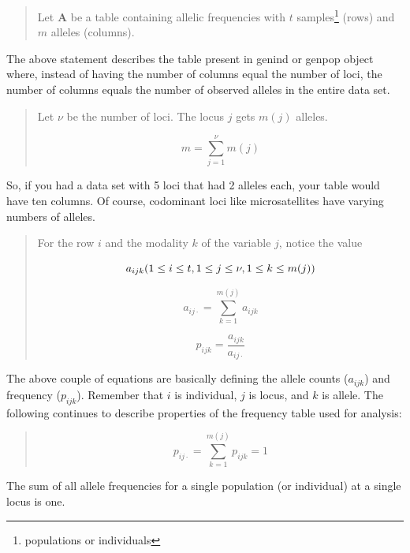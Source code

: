 \documentclass[letterpaper]{article}\usepackage[]{graphicx}\usepackage[]{color}
\begin{document}
\begin{quote}
Let \textbf{A} be a table containing allelic frequencies with $t$
samples\footnote{populations or individuals} (rows) and $m$ alleles (columns).\\
\end{quote}
The above statement describes the table present in genind or genpop object
where, instead of having the number of columns equal the number of loci, the
number of columns equals the number of observed alleles in the entire data set.

\begin{quote}
Let $\nu$ be the number of loci. The locus $j$ gets $m(j)$ alleles. 

\begin{equation}
  m=\sum_{j=1}^{\nu} m(j)
\end{equation}
\end{quote}

So, if you had a data set with 5 loci that had 2 alleles each, your table
would have ten columns. Of course, codominant loci like microsatellites have
varying numbers of alleles.


\begin{quote}
For the row $i$ and the modality $k$ of the variable $j$, notice the value

\begin{equation}
  a_{ijk}\\ (1 \leq i \leq t,\\ 1 \leq j \leq \nu,\\ 1 \leq k \leq m(j))
\end{equation}

\begin{equation}
  a_{ij\cdot}=\sum_{k=1}^{m(j)}a_{ijk} 
\end{equation}

\begin{equation}
  p_{ijk}=\frac{a_{ijk}}{a_{ij\cdot}}
\end{equation}
\end{quote}

The above couple of equations are basically defining the allele counts
($a_{ijk}$) and frequency ($p_{ijk}$). Remember that $i$ is individual, $j$ is
locus, and $k$ is allele. The following continues to describe properties of the
frequency table used for analysis:

\begin{quote}
\begin{equation}
 p_{ij\cdot}=\sum_{k=1}^{m(j)}p_{ijk}=1
\end{equation}
\end{quote}
The sum of all allele frequencies for a single population (or individual) at a 
single locus is one.
\end{document}

